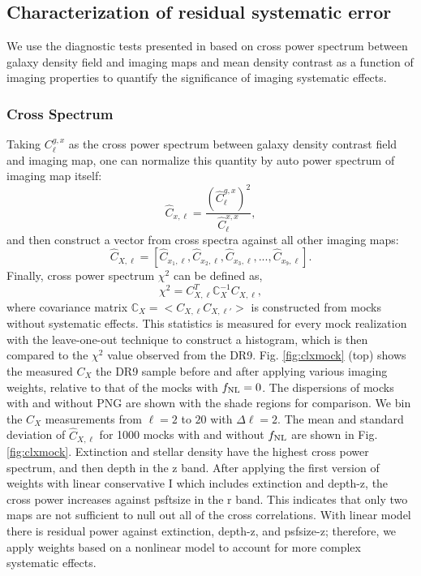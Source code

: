 \subsection{Characterization of residual systematic error}
\label{ssec:characterization}
We use the diagnostic tests presented in  based on cross power spectrum between galaxy density field and imaging maps and mean density contrast as a function of imaging properties to quantify the significance of imaging systematic effects. 


\subsubsection{Cross Spectrum}
Taking $C^{g,x}_{\ell}$ as the cross power spectrum between galaxy density contrast field and imaging map, one can normalize this quantity by auto power spectrum of imaging map itself:
\begin{equation}
\hat{C}_{x, \ell} = \frac{(\hat{C}^{g,x}_{\ell})^{2}}{\hat{C}^{x,x}_{\ell}},
\end{equation}
and then construct a vector from cross spectra against all other imaging maps:
\begin{equation}
\hat{C}_{X, \ell} = [\hat{C}_{x_{1}, \ell}, \hat{C}_{x_{2}, \ell}, \hat{C}_{x_{3}, \ell}, ..., \hat{C}_{x_{9}, \ell}].
\end{equation}
Finally, cross power spectrum $\chi^{2}$ can be defined as,
\begin{equation}
\chi^{2} = C^{T}_{X, \ell} \mathbb{C}_{X}^{-1} C_{X, \ell},
\end{equation}
where covariance matrix $\mathbb{C}_{X} = < C_{X, \ell} C_{X, \ell'} >$ is constructed from mocks without systematic effects. This statistics is measured for every mock realization with the leave-one-out technique to construct a histogram, which is then compared to the $\chi^{2}$ value observed from the DR9.  Fig. \ref{fig:clxmock} (top) shows the measured $C_{X}$ the DR9 sample before and after applying various imaging weights, relative to that of the mocks with $f_{\rm NL}=0$. The dispersions of mocks with and without PNG are shown with the shade regions for comparison. We bin the $C_{X}$ measurements from $\ell=2$ to $20$ with $\Delta\ell=2$. The mean and standard deviation of $\hat{C}_{X, \ell}$ for 1000 mocks with and without $f_{\rm NL}$ are shown in Fig. \ref{fig:clxmock}.  Extinction and stellar density have the highest cross power spectrum, and then depth in the z band. After applying the first version of weights with linear conservative I which includes extinction and depth-z, the cross power increases against psftsize in the r band. This indicates that only two maps are not sufficient to null out all of the cross correlations. With linear model there is residual power against extinction, depth-z, and psfsize-z; therefore, we apply weights based on a nonlinear model to account for more complex systematic effects. 

